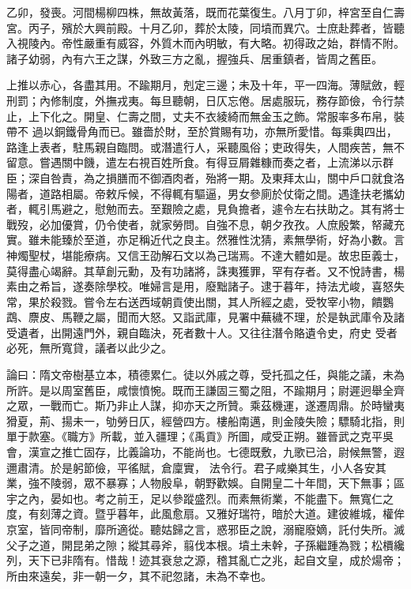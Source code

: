 \begin{pinyinscope}
 乙卯，發喪。河間楊柳四株，無故黃落，既而花葉復生。八月丁卯，梓宮至自仁壽宮。丙子，殯於大興前殿。十月乙卯，葬於太陵，同墳而異穴。士庶赴葬者，皆聽入視陵內。帝性嚴重有威容，外質木而內明敏，有大略。初得政之始，群情不附。諸子幼弱，內有六王之謀，外致三方之亂，握強兵、居重鎮者，皆周之舊臣。



 上推以赤心，各盡其用。不踰期月，剋定三邊；未及十年，平一四海。薄賦斂，輕刑罰；內修制度，外撫戎夷。每旦聽朝，日仄忘倦。居處服玩，務存節儉，令行禁止，上下化之。開皇、仁壽之間，丈夫不衣綾綺而無金玉之飾。常服率多布帛，裝帶不
 過以銅鐵骨角而已。雖嗇於財，至於賞賜有功，亦無所愛惜。每乘輿四出，路逢上表者，駐馬親自臨問。或潛遣行人，采聽風俗；吏政得失，人間疾苦，無不留意。嘗遇關中饑，遣左右視百姓所食。有得豆屑雜糠而奏之者，上流涕以示群臣；深自咎責，為之損膳而不御酒肉者，殆將一期。及東拜太山，關中戶口就食洛陽者，道路相屬。帝敕斥候，不得輒有驅逼，男女參廁於仗衛之間。遇逢扶老攜幼者，輒引馬避之，慰勉而去。至艱險之處，見負擔者，遽令左右扶助之。其有將士戰歿，必加優賞，仍令使者，就家勞問。自強不息，朝夕孜孜。人庶殷繁，帑藏充
 實。雖未能臻於至道，亦足稱近代之良主。然雅性沈猜，素無學術，好為小數。言神燭聖杖，堪能療病。又信王劭解石文以為己瑞焉。不達大體如是。故忠臣義士，莫得盡心竭辭。其草創元勳，及有功諸將，誅夷獲罪，罕有存者。又不悅詩書，楊素由之希旨，遂奏除學校。唯婦言是用，廢黜諸子。逮于暮年，持法尤峻，喜怒失常，果於殺戮。嘗令左右送西域朝貢使出關，其人所經之處，受牧宰小物，饋鸚鵡、麖皮、馬鞭之屬，聞而大怒。又詣武庫，見署中蕪穢不理，於是執武庫令及諸受遺者，出開遠門外，親自臨決，死者數十人。又往往潛令賂遺令史，府史
 受者必死，無所寬貸，議者以此少之。



 論曰：隋文帝樹基立本，積德累仁。徒以外戚之尊，受托孤之任，與能之議，未為所許。是以周室舊臣，咸懷憤惋。既而王謙固三蜀之阻，不踰期月；尉遲迥舉全齊之眾，一戰而亡。斯乃非止人謀，抑亦天之所贊。乘茲機運，遂遷周鼎。於時蠻夷猾夏，荊、揚未一，劬勞日仄，經營四方。樓船南邁，則金陵失險；驃騎北指，則單于款塞。《職方》所載，並入疆理；《禹貢》所圖，咸受正朔。雖晉武之克平吳會，漢宣之推亡固存，比義論功，不能尚也。七德既敷，九歌已洽，尉候無警，遐邇肅清。於是躬節儉，平徭賦，倉廩實，
 法令行。君子咸樂其生，小人各安其業，強不陵弱，眾不暴寡；人物殷阜，朝野歡娛。自開皇二十年間，天下無事；區宇之內，晏如也。考之前王，足以參蹤盛烈。而素無術業，不能盡下。無寬仁之度，有刻薄之資。暨乎暮年，此風愈扇。又雅好瑞符，暗於大道。建彼維城，權侔京室，皆同帝制，靡所適從。聽姑歸之言，惑邪臣之說，溺寵廢嫡，託付失所。滅父子之道，開昆弟之隙；縱其尋斧，翦伐本根。墳土未幹，子孫繼踵為戮；松檟纔列，天下已非隋有。惜哉！迹其衰怠之源，稽其亂亡之兆，起自文皇，成於煬帝；所由來遠矣，非一朝一夕，其不祀忽諸，未為不幸也。



\end{pinyinscope}